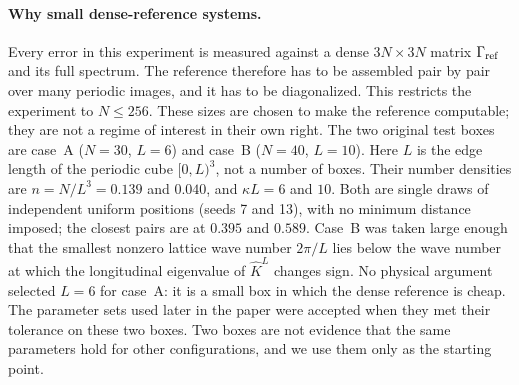 \paragraph{Why small dense-reference systems.}
Every error in this experiment is measured against a dense $3N\times3N$ matrix $\Gamma_{\rm ref}$ and its full
spectrum. The reference therefore has to be assembled pair by pair over many periodic images, and it has to be
diagonalized. This restricts the experiment to $N\le256$. These sizes are chosen to make the reference computable;
they are not a regime of interest in their own right. The two original test boxes are case~A ($N=30$, $L=6$) and case~B
($N=40$, $L=10$). Here $L$ is the edge length of the periodic cube $[0,L)^3$, not a number of boxes. Their number
densities are $n=N/L^3=0.139$ and $0.040$, and $\kappa L=6$ and $10$. Both are single draws of independent uniform
positions (seeds 7 and 13), with no minimum distance imposed; the closest pairs are at $0.395$ and $0.589$. Case~B was
taken large enough that the smallest nonzero lattice wave number $2\pi/L$ lies below the wave number at which the
longitudinal eigenvalue of $\hat K^L$ changes sign. No physical argument selected $L=6$ for case~A: it is a small box
in which the dense reference is cheap. The parameter sets used later in the paper were accepted when they met their
tolerance on these two boxes. Two boxes are not evidence that the same parameters hold for other configurations, and we
use them only as the starting point.

